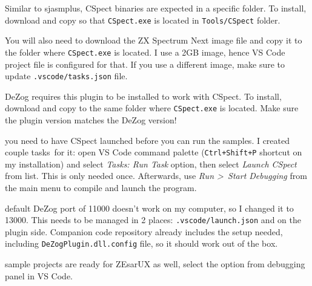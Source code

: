 \begin{description}[style=unboxed,leftmargin=0cm]
	Similar to sjasmplus, CSpect binaries are expected in a specific folder. To install, download and copy so that {\tt CSpect.exe} is located in {\tt Tools/CSpect} folder.

	\item[CSpect Next Image (\url{http://www.zxspectrumnext.online/\#sd})]\hfill

	You will also need to download the ZX Spectrum Next image file and copy it to the folder where {\tt CSpect.exe} is located. I use a 2GB image, hence VS Code project file is configured for that. If you use a different image, make sure to update {\tt .vscode/tasks.json} file.
	
	\item[DeZog CSpect plugin (\url{https://github.com/maziac/DeZogPlugin})]\hfill

	DeZog requires this plugin to be installed to work with CSpect. To install, download and copy to the same folder where {\tt CSpect.exe} is located. Make sure the plugin version matches the DeZog version!

\end{description}

{
	\footnotesize

	\begin{description}[topsep=1pt,itemsep=1pt,labelindent=0pt,leftmargin=0pt]		
		\item[Note:] you need to have CSpect launched before you can run the samples. I created couple tasks\footnotemark~for it: open VS Code command palette ({\tt Ctrl+Shift+P} shortcut on my installation) and select \textit{Tasks: Run Task} option, then select \textit{Launch CSpect} from list. This is only needed once. Afterwards, use \textit{Run \textgreater ~Start Debugging} from the main menu to compile and launch the program.

		\item[Note:] default DeZog port of 11000 doesn't work on my computer, so I changed it to 13000. This needs to be managed in 2 places: {\tt .vscode/launch.json} and on the plugin side. Companion code repository already includes the setup needed, including {\tt DeZogPlugin.dll.config} file, so it should work out of the box.
	
		\item[Note:] sample projects are ready for ZEsarUX as well, select the option from debugging panel in VS Code.
	\end{description}
}



